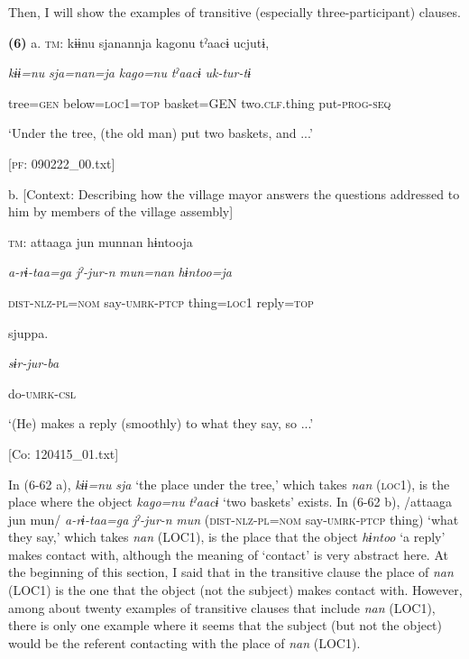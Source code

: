 Then, I will show the examples of transitive (especially three-participant) clauses.

\textbf{(6)}  a.  \textsc{tm}:  kɨɨnu  sjanannja  kagonu  tˀaacɨ  ucjutɨ,

      \textit{kɨɨ=nu}  \textit{sja=nan=ja}  \textit{kago=nu}  \textit{tˀaacɨ}  \textit{uk-tur-tɨ}

      tree=\textsc{gen}  below=\textsc{loc}1=\textsc{top}  basket=GEN  two.\textsc{clf}.thing  put-\textsc{prog}-\textsc{seq}

      ‘Under the tree, (the old man) put two baskets, and ...’

      [\textsc{pf}: 090222\_00.txt]

  b.  [Context: Describing how the village mayor answers the questions addressed to him by  members of the village assembly]

    \textsc{tm}:  attaaga  jun  munnan  hɨntooja

      \textit{a-rɨ-taa=ga}  \textit{jˀ-jur-n}  \textit{mun=nan}  \textit{hɨntoo=ja}

      \textsc{dist}-\textsc{nlz}-\textsc{pl}=\textsc{nom}  say-\textsc{umrk}-\textsc{ptcp}  thing=\textsc{loc}1  reply=\textsc{top}

      sjuppa.

      \textit{sɨr-jur-ba}

      do-\textsc{umrk}-\textsc{csl}

      ‘(He) makes a reply (smoothly) to what they say, so ...’

      [Co: 120415\_01.txt]

In (6-62 a), \textit{kɨɨ=nu} \textit{sja} ‘the place under the tree,’ which takes \textit{nan} (\textsc{loc}1), is the place where the object \textit{kago=nu} \textit{tˀaacɨ} ‘two baskets’ exists. In (6-62 b), /attaaga jun mun/ \textit{a-rɨ-taa=ga} \textit{jˀ-jur-n} \textit{mun} (\textsc{dist}-\textsc{nlz}-\textsc{pl}=\textsc{nom} say-\textsc{umrk}-\textsc{ptcp} thing) ‘what they say,’ which takes \textit{nan} (LOC1), is the place that the object \textit{hɨntoo} ‘a reply’ makes contact with, although the meaning of ‘contact’ is very abstract here. At the beginning of this section, I said that in the transitive clause the place of \textit{nan} (LOC1) is the one that the object (not the subject) makes contact with. However, among about twenty examples of transitive clauses that include \textit{nan} (LOC1), there is only one example where it seems that the subject (but not the object) would be the referent contacting with the place of \textit{nan} (LOC1).

